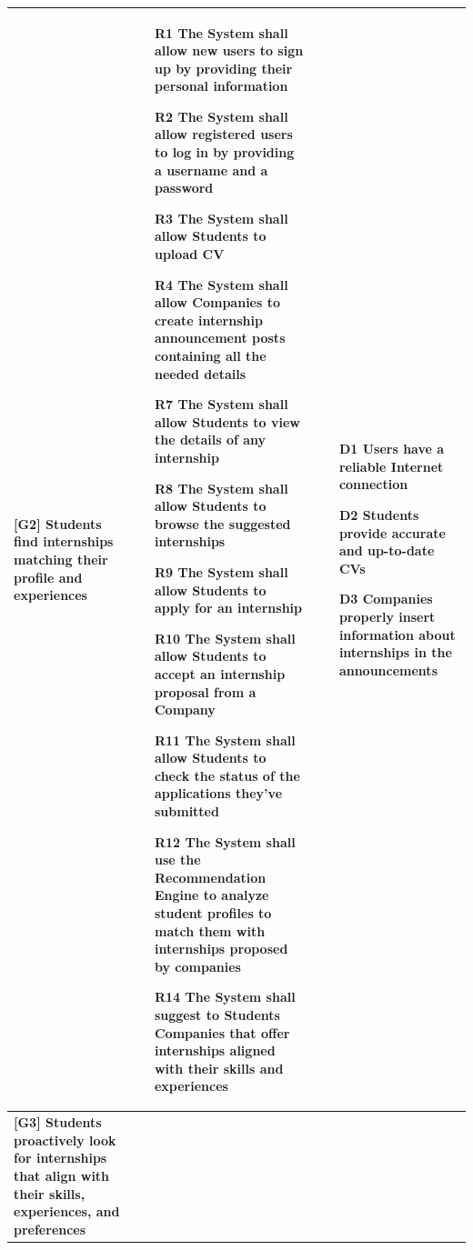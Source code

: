\begin{longtable}{|p{4cm}|p{5.5cm}|p{5.5cm}|}
    \textbf{[G2] \newline Students find internships matching their profile and experiences} & 
    \begin{itemize}[label=$\bullet$]
        \item [R1] The System shall allow new users to sign up by providing their personal information
        \item [R2] The System shall allow registered users to log in by providing a username and a password
        \item [R3] The System shall allow Students to upload CV
        \item [R4] The System shall allow Companies to create internship announcement posts containing all the needed details
        \item [R7] The System shall allow Students to view the details of any internship
        \item [R8] The System shall allow Students to browse the suggested internships
        \item [R9] The System shall allow Students to apply for an internship
        \item [R10] The System shall allow Students to accept an internship proposal from a Company
        \item [R11] The System shall allow Students to check the status of the applications they’ve submitted
        \item [R12] The System shall use the Recommendation Engine to analyze student profiles to match them with internships proposed by companies
        \item [R14] The System shall suggest to Students Companies that offer internships aligned with their skills and experiences
    \end{itemize}
    &
    \begin{itemize}[label=$\bullet$]
        \item [D1] Users have a reliable Internet connection
        \item [D2] Students provide accurate and up-to-date CVs
        \item [D3] Companies properly insert information about internships in the announcements
    \end{itemize} \\ 
    \hline
        \textbf{[G3] \newline Students proactively look for internships that align with their skills, experiences, and preferences} & 

\end{longtable}

